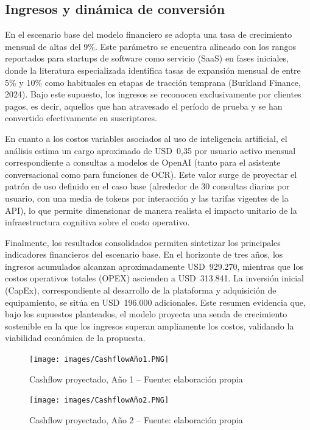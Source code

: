 \subsection{Ingresos y dinámica de conversión}

En el escenario base del modelo financiero se adopta una tasa de crecimiento mensual de altas del 9\%. Este parámetro se encuentra alineado con los rangos reportados para startups de software como servicio (SaaS) en fases iniciales, donde la literatura especializada identifica tasas de expansión mensual de entre 5\% y 10\% como habituales en etapas de tracción temprana (Burkland Finance, 2024). Bajo este supuesto, los ingresos se reconocen exclusivamente por clientes pagos, es decir, aquellos que han atravesado el período de prueba y se han convertido efectivamente en suscriptores.

En cuanto a los costos variables asociados al uso de inteligencia artificial, el análisis estima un cargo aproximado de USD~0,35 por usuario activo mensual correspondiente a consultas a modelos de OpenAI (tanto para el asistente conversacional como para funciones de OCR). Este valor surge de proyectar el patrón de uso definido en el caso base (alrededor de 30 consultas diarias por usuario, con una media de tokens por interacción y las tarifas vigentes de la API), lo que permite dimensionar de manera realista el impacto unitario de la infraestructura cognitiva sobre el costo operativo.

Finalmente, los resultados consolidados permiten sintetizar los principales indicadores financieros del escenario base. En el horizonte de tres años, los ingresos acumulados alcanzan aproximadamente USD~929.270, mientras que los costos operativos totales (OPEX) ascienden a USD~313.841. La inversión inicial (CapEx), correspondiente al desarrollo de la plataforma y adquisición de equipamiento, se sitúa en USD~196.000 adicionales. Este resumen evidencia que, bajo los supuestos planteados, el modelo proyecta una senda de crecimiento sostenible en la que los ingresos superan ampliamente los costos, validando la viabilidad económica de la propuesta.


\begin{figure}[!htbp]
  \centering
  \texttt{[image: images/CashflowAño1.PNG]}
  \caption{Cashflow proyectado, Año 1 -- Fuente: elaboración propia}
  \label{fig:cashflow-anio1}
\end{figure}

\begin{figure}[!htbp]
  \centering
  \texttt{[image: images/CashflowAño2.PNG]}
  \caption{Cashflow proyectado, Año 2 -- Fuente: elaboración propia}
  \label{fig:cashflow-anio2}
\end{figure}

